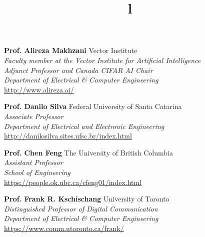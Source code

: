 \documentclass[margin, line]{res}
\begin{document}
\begin{resume}
\textbf{Prof. Alireza Makhzani} \hfill Vector Institute\\
{\sl Faculty member at the Vector Institute for Artificial Intelligence}\\
{\sl Adjunct Professor and Canada CIFAR AI Chair}\\
{\sl Department of Electrical \& Computer Engineering}\\
\url{http://www.alireza.ai/}

\textbf{Prof. Danilo Silva} \hfill Federal University of Santa Catarina\\
{\sl Associate Professor}\\
{\sl Department of Electrical and Electronic Engineering}\\
\url{http://danilosilva.sites.ufsc.br/index.html}

\textbf{Prof. Chen Feng} \hfill The University of British Columbia\\
{\sl Assistant Professor}\\
{\sl School of Engineering}\\
\url{https://people.ok.ubc.ca/cfeng01/index.html}

\textbf{Prof. Frank R. Kschischang} \hfill University of Toronto\\
{\sl Distinguished Professor of Digital Communication}\\
{\sl Department of Electrical \& Computer Engineering}\\
\url{https://www.comm.utoronto.ca/frank/}



\begin{format}
\title{l}\\
\\
\body\\
\end{format}

\end{resume}
\(\)
\end{document}

